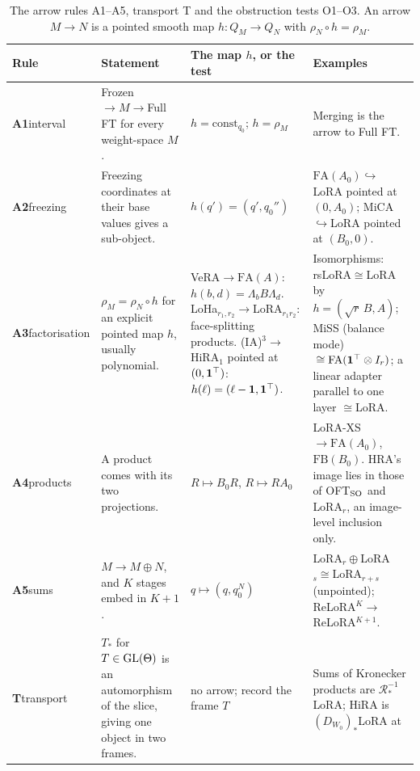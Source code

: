 \begin{table}[t]
\centering\footnotesize
\caption{The arrow rules A1--A5, transport T and the obstruction tests O1--O3. An arrow $M\to N$ is a pointed smooth
map $h:Q_M\to Q_N$ with $\rho_N\circ h=\rho_M$.}\label{tab:atlas-rules}
\begin{tabularx}{\linewidth}{@{}>{\raggedright\arraybackslash}p{1.8cm}>{\raggedright\arraybackslash}X%
>{\raggedright\arraybackslash}p{3.65cm}>{\raggedright\arraybackslash}p{4.5cm}@{}}
\toprule\headrow
\textbf{Rule} & \textbf{Statement} & \textbf{The map $h$, or the test} & \textbf{Examples}\\\midrule
\textbf{A1}\newline interval & Frozen${}\to M\to{}$Full FT for every weight-space $M$. & $h=\mathrm{const}_{q_0}$; $h=\rho_M$ &
Merging is the arrow to Full FT.\\
\textbf{A2}\newline freezing & Freezing coordinates at their base values gives a sub-object. & $h(q')=(q',q_0'')$ &
$\mathrm{FA}(A_0)\hookrightarrow{}$LoRA pointed at $(0,A_0)$; MiCA${}\hookrightarrow{}$LoRA pointed at $(B_0,0)$.\\
\textbf{A3}\newline factorisation & $\rho_M=\rho_N\circ h$ for an explicit pointed map $h$, usually polynomial. & VeRA${}\to
\mathrm{FA}(A)$: $h(b,d)=\Lambda_bB\Lambda_d$. LoHa$_{r_1,r_2}\to{}$LoRA$_{r_1r_2}$: face-splitting products.
(IA)$^3\to{}$HiRA$_1$ pointed at $(0,\mathbf 1^{\top})$: $h(\ell)=(\ell-\mathbf 1,\mathbf 1^{\top})$. & Isomorphisms:
rsLoRA${}\cong{}$LoRA by $h=(\sqrt r\,B,A)$; MiSS (balance mode) ${}\cong\mathrm{FA}(\mathbf 1^{\top}\otimes I_r)$; a linear
adapter parallel to one layer ${}\cong{}$LoRA.\\
\textbf{A4}\newline products & A product comes with its two projections. & $R\mapsto B_0R$, $R\mapsto RA_0$ &
LoRA-XS${}\to\mathrm{FA}(A_0)$, $\mathrm{FB}(B_0)$. HRA's image lies in those of OFT$_{\mathrm{SO}}$ and LoRA$_r$, an
image-level inclusion only.\\
\textbf{A5}\newline sums & $M\to M\oplus N$, and $K$ stages embed in $K+1$. & $q\mapsto(q,q_0^N)$ &
LoRA$_r\oplus{}$LoRA$_s\cong{}$LoRA$_{r+s}$ (unpointed); ReLoRA$^K\to{}$ReLoRA$^{K+1}$.\\\midrule
\textbf{T}\newline transport & $T_*$ for $T\in\mathrm{GL}(\Theta)$ is an automorphism of the slice, giving one object in two frames. & no
arrow; record the frame $T$ & Sums of Kronecker products are $\mathcal R^{-1}_*{}$LoRA; HiRA is $(D_{W_0})_*{}$LoRA at

\end{tabularx}
\end{table}
